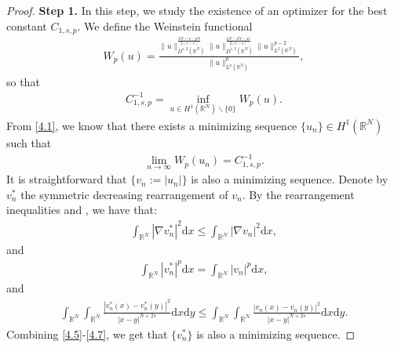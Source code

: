 \documentclass[12pt,a4paper,reqno]{amsart}
\numberwithin{equation}{section}
\begin{document}
\begin{proof}
{\bf Step 1.}
In this step, we study the existence of an optimizer for the best constant $C_{1,s,p}$.
We define the Weinstein functional
\begin{equation*}
\begin{aligned}
W_{p}(u)=
\frac{
\|u\|_{D^{s,2}(\mathbb{R}^{N})}^{\frac{2N+4-pN}{2(1-s)}}
\|u\|_{D^{1,2}(\mathbb{R}^{N})}^{\frac{pN-2N-4s}{2(1-s)}}
\|u\|_{L^{2}(\mathbb{R}^{N})}^{p-2}
}
{\|u\|_{L^{p}(\mathbb{R}^{N})}^{p}},
\end{aligned}
\end{equation*}
so that
\begin{equation*}
\begin{aligned}
C_{1,s,p}^{-1}=\inf_{u\in H^{1}(\mathbb{R}^{N})\backslash \{0\}}W_{p}(u).
\end{aligned}
\end{equation*}
From \eqref{4.1}, we know that there exists a minimizing sequence $\{u_{n}\}\in H^{1}(\mathbb{R}^{N})$ such that
\begin{equation*}
\begin{aligned}
\lim_{n\to\infty}
W_{p}(u_{n})
=C_{1,s,p}^{-1}.
\end{aligned}
\end{equation*}
It is straightforward that $\{v_{n}:=|u_{n}|\}$ is also a minimizing sequence.
Denote by $v_{n}^{*}$ the symmetric decreasing rearrangement of $v_{n}$.
By the rearrangement inequalities \cite[Theorems 3.4 and 3.7]{Lieb2001} and \cite{Burchard-Hajaiej2006JFA,Hajaiej-Stuart2003PLMS,Hajaiej2005Edinburgh},
we have that:
\begin{equation}\label{4.5}
\begin{aligned}
\int_{\mathbb{R}^{N}}
|\nabla v_{n}^{*}|^{2}
\mathrm{d}x
\leqslant
\int_{\mathbb{R}^{N}}
|\nabla v_{n}|^{2}
\mathrm{d}x,
\end{aligned}
\end{equation}
and
\begin{equation}\label{4.6}
\begin{aligned}
\int_{\mathbb{R}^{N}}
|v_{n}^{*}|^{p}
\mathrm{d}x
=
\int_{\mathbb{R}^{N}}
|v_{n}|^{p}
\mathrm{d}x,
\end{aligned}
\end{equation}
and
\begin{equation}\label{4.7}
\begin{aligned}
\int_{\mathbb{R}^{N}}
\int_{\mathbb{R}^{N}}
\frac{|v_{n}^{*}(x)-v_{n}^{*}(y)|^{2}}{|x-y|^{N+2s}}
\mathrm{d}x
\mathrm{d}y
\leqslant
\int_{\mathbb{R}^{N}}
\int_{\mathbb{R}^{N}}
\frac{|v_{n}(x)-v_{n}(y)|^{2}}{|x-y|^{N+2s}}
\mathrm{d}x
\mathrm{d}y.
\end{aligned}
\end{equation}
Combining \eqref{4.5}-\eqref{4.7},
we get that $\{v_{n}^{*}\}$
is also a minimizing sequence.


\end{proof}
\end{document}

